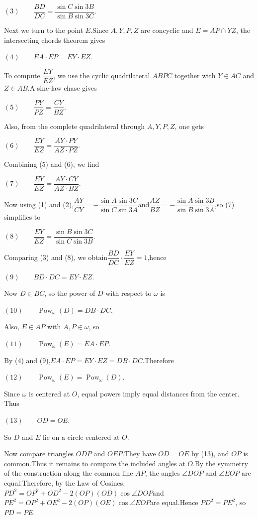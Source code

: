\begin{enumerate}
 $(3)\qquad \dfrac{BD}{DC}=\dfrac{\sin C\sin 3B}{\sin B\sin 3C}$.

 Next we turn to the point $E$.Since $A,Y,P,Z$ are concyclic and $E=AP\cap YZ$, the intersecting chords theorem gives

 $(4)\qquad EA\cdot EP=EY\cdot EZ$.

 To compute $\dfrac{EY}{EZ}$, we use the cyclic quadrilateral $ABPC$ together with $Y\in AC$ and $Z\in AB$.A sine-law chase gives

 $(5)\qquad \dfrac{PY}{PZ}=\dfrac{CY}{BZ}$.

 Also, from the complete quadrilateral through $A,Y,P,Z$, one gets

 $(6)\qquad \dfrac{EY}{EZ}=\dfrac{AY\cdot PY}{AZ\cdot PZ}$.

 Combining (5) and (6), we find

 $(7)\qquad \dfrac{EY}{EZ}=\dfrac{AY\cdot CY}{AZ\cdot BZ}$.

 Now using (1) and (2),$\dfrac{AY}{CY}=-\dfrac{\sin A\sin 3C}{\sin C\sin 3A}$and$\dfrac{AZ}{BZ}=-\dfrac{\sin A\sin 3B}{\sin B\sin 3A}$,so (7) simplifies to

 $(8)\qquad \dfrac{EY}{EZ}=\dfrac{\sin B\sin 3C}{\sin C\sin 3B}$.

 Comparing (3) and (8), we obtain$\dfrac{BD}{DC}\cdot\dfrac{EY}{EZ}=1$,hence

 $(9)\qquad BD\cdot DC=EY\cdot EZ$.

 Now $D\in BC$, so the power of $D$ with respect to $\omega$ is

 $(10)\qquad \operatorname{Pow}_\omega(D)=DB\cdot DC$.

 Also, $E\in AP$ with $A,P\in\omega$, so

 $(11)\qquad \operatorname{Pow}_\omega(E)=EA\cdot EP$.

 By (4) and (9),$EA\cdot EP=EY\cdot EZ=DB\cdot DC$.Therefore

 $(12)\qquad \operatorname{Pow}_\omega(E)=\operatorname{Pow}_\omega(D)$.

 Since $\omega$ is centered at $O$, equal powers imply equal distances from the center. Thus

 $(13)\qquad OD=OE$.

 So $D$ and $E$ lie on a circle centered at $O$.

 Now compare triangles $ODP$ and $OEP$.They have $OD=OE$ by (13), and $OP$ is common.Thus it remains to compare the included angles at $O$.By the symmetry of the construction along the common line $AP$, the angles $\angle DOP$ and $\angle EOP$ are equal.Therefore, by the Law of Cosines,$PD^2=OP^2+OD^2-2(OP)(OD)\cos\angle DOP$and$PE^2=OP^2+OE^2-2(OP)(OE)\cos\angle EOP$are equal.Hence $PD^2=PE^2$, so $PD=PE$.


\end{enumerate}
